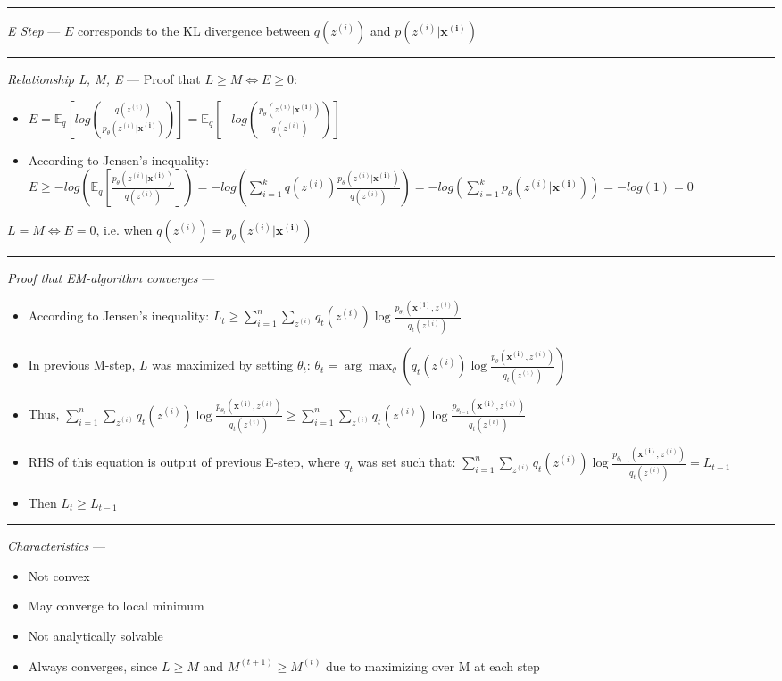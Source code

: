 {\color{lightgray}\hrule height 0.001mm}

\emph{E Step} ---
$E$ corresponds to the KL divergence between $q(z^{(i)})$ and $p( z^{(i)} | \boldsymbol{x^{(i)}} )$

{\color{lightgray}\hrule height 0.001mm}

\emph{Relationship L, M, E} ---
Proof that $L \geq M \Leftrightarrow E \geq 0$:
\begin{itemize}
    \item $E = \mathbb{E}_q[ log(\frac{ q(z^{(i)}) }{ p_{\theta}(z^{(i)} | \boldsymbol{x^{(i)}}) }) ] = \mathbb{E}_q[ -log(\frac{ p_{\theta}(z^{(i)} | \boldsymbol{x^{(i)}}) }{ q(z^{(i)}) }) ]$
    \item According to Jensen's inequality: $E \geq -log(\mathbb{E}_q[\frac{ p_{\theta}(z^{(i)} | \boldsymbol{x^{(i)}}) }{ q(z^{(i)}) }]) = -log(\sum_{i=1}^k q(z^{(i)}) \frac{ p_{\theta}(z^{(i)} | \boldsymbol{x^{(i)}}) }{ q(z^{(i)}) }) = -log(\sum_{i=1}^k p_{\theta}(z^{(i)} | \boldsymbol{x^{(i)}})) = -log(1) = 0$
\end{itemize}
$L = M \Leftrightarrow E = 0$, i.e. when $q(z^{(i)}) = p_\theta( z^{(i)} | \boldsymbol{x^{(i)}})$

{\color{lightgray}\hrule height 0.001mm}

\emph{Proof that EM-algorithm converges} ---
\begin{itemize}
    \item According to Jensen's inequality: $L_t \geq \sum_{i=1}^n \sum_{z^{(i)}} q_t(z^{(i)}) \log \frac{p_{\theta_t}( \boldsymbol{x^{(i)}}, z^{(i)})}{q_t(z^{(i)})}$
    \item In previous M-step, $L$ was maximized by setting $\theta_t$: $\theta_t = \arg\max_\theta (q_t(z^{(i)}) \log \frac{p_\theta( \boldsymbol{x^{(i)}}, z^{(i)})}{q_t(z^{(i)})})$
    \item Thus, $\sum_{i=1}^n \sum_{z^{(i)}} q_t(z^{(i)}) \log \frac{p_{\theta_t}( \boldsymbol{x^{(i)}}, z^{(i)})}{q_t(z^{(i)})} \geq \sum_{i=1}^n \sum_{z^{(i)}} q_t(z^{(i)}) \log \frac{p_{\theta_{t-1}}( \boldsymbol{x^{(i)}}, z^{(i)})}{q_t(z^{(i)})}$
    \item RHS of this equation is output of previous E-step, where $q_t$ was set such that: $\sum_{i=1}^n \sum_{z^{(i)}} q_t(z^{(i)}) \log \frac{p_{\theta_{t-1}}( \boldsymbol{x^{(i)}}, z^{(i)})}{q_t(z^{(i)})} = L_{t-1}$
    \item Then $L_t \geq L_{t-1}$
\end{itemize}

{\color{lightgray}\hrule height 0.001mm}

\emph{Characteristics} --- 
\begin{itemize}
    \item Not convex
    \item May converge to local minimum
    \item Not analytically solvable
    \item Always converges, since $L \geq M$ and $M^{(t+1)} \geq M^{(t)}$ due to maximizing over M at each step
\end{itemize}